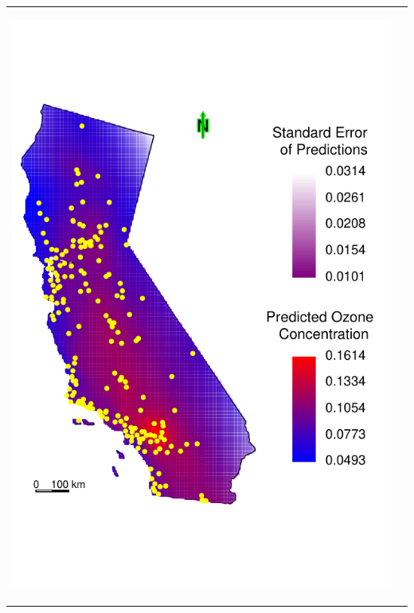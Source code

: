 \documentclass[mathserif,compress]{beamer}\usepackage{graphicx, color}
\makeatletter
\def\maxwidth{ %
  \ifdim\Gin@nat@width>\linewidth
    \linewidth
  \else
    \Gin@nat@width
  \fi
}
\makeatother
\begin{document}
\begin{frame}[fragile]
\begin{tabular} {p{4.5cm} p{4.5cm}}
\begin{center}
			\includegraphics[width = \maxwidth]{figure/CA-predMap} 
		\end{center}
	\end{tabular}

\end{frame}

\end{document}
